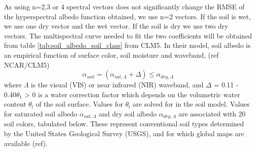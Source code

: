 \documentclass[twoside,10pt]{report}
\begin{document}
As using n=2,3 or 4 spectral vectors does not significantly change the RMSE of the hyperspectral albedo function obtained\citep{Jiang2019}, we use n=2 vectors. If the soil is wet, we use one dry vector and the wet vector. If the soil is dry we use two dry vectors. The multispectral curve needed to fit the two coefficients will be obtained from table \ref{tab:soil_albedo_soil_class} from CLM5. In their model, soil albedo is an empirical function of surface color, soil moisture and waveband, (ref NCAR/CLM5)
\begin{equation}
    \alpha_{soil}= (\alpha_{sat,\Lambda} + \Delta) \leq \alpha_{dry,\Lambda}
    \label{eq:soil_albedo_moist}
\end{equation}
\noindent where $\Lambda$ is the visual (VIS) or near infrared (NIR) waveband, and $\Delta$ = 0.11 -  0.40$\theta_1$ > 0 is a water correction factor which depends on the volumetric water content $\theta_l$ of the soil surface. Values for $\theta_l$ are solved for in the soil model. Values for saturated soil albedo $\alpha_{sat,\Lambda}$ and dry soil albedo $\alpha_{dry,\Lambda}$ are associated with 20 soil colors, tabulated below. These represent conventional soil types determined by the United States Geological Survey (USGS), and for which global maps are available (ref).
\end{document}

